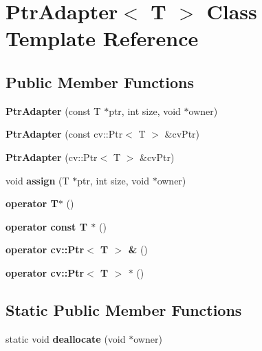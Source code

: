 \hypertarget{class_ptr_adapter}{}\section{Ptr\+Adapter$<$ T $>$ Class Template Reference}
\label{class_ptr_adapter}
\subsection*{Public Member Functions}
\begin{DoxyCompactItemize}
\item 
\mbox{\label{class_ptr_adapter_a4c05293dceffd5abb66453aa782e6b78}} 
{\bfseries Ptr\+Adapter} (const T $\ast$ptr, int size, void $\ast$owner)
\item 
\mbox{\label{class_ptr_adapter_aef2d827fc1309ca834873759fccde182}} 
{\bfseries Ptr\+Adapter} (const cv\+::\+Ptr$<$ T $>$ \&cv\+Ptr)
\item 
\mbox{\label{class_ptr_adapter_a58d5c6c834ed33d409b2005b183c2b06}} 
{\bfseries Ptr\+Adapter} (cv\+::\+Ptr$<$ T $>$ \&cv\+Ptr)
\item 
\mbox{\label{class_ptr_adapter_a6608d32d9f3d4986ac3c03c9d2fe48f1}} 
void {\bfseries assign} (T $\ast$ptr, int size, void $\ast$owner)
\item 
\mbox{\label{class_ptr_adapter_ae71bc3f9ad889c5c917da5204250c095}} 
{\bfseries operator T$\ast$} ()
\item 
\mbox{\label{class_ptr_adapter_a6690cd0d20c26468c2c6d5c3f344a727}} 
{\bfseries operator const T $\ast$} ()
\item 
\mbox{\label{class_ptr_adapter_a64bf9a925ea5ed9635db964b09ec0e73}} 
{\bfseries operator cv\+::\+Ptr$<$ T $>$ \&} ()
\item 
\mbox{\label{class_ptr_adapter_a6f30531a717fbc6ce8fd1b81afd6cd5a}} 
{\bfseries operator cv\+::\+Ptr$<$ T $>$ $\ast$} ()
\end{DoxyCompactItemize}
\subsection*{Static Public Member Functions}
\begin{DoxyCompactItemize}
\item 
\mbox{\label{class_ptr_adapter_abfd1c2188d5e7f99a101d20c264031da}} 
static void {\bfseries deallocate} (void $\ast$owner)
\end{DoxyCompactItemize}
